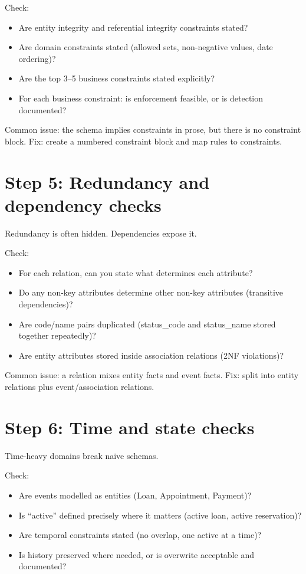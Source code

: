 Check:
\begin{itemize}[leftmargin=*,nosep]
  \item Are entity integrity and referential integrity constraints stated?
  \item Are domain constraints stated (allowed sets, non-negative values, date ordering)?
  \item Are the top 3--5 business constraints stated explicitly?
  \item For each business constraint: is enforcement feasible, or is detection documented?
\end{itemize}

Common issue: the schema implies constraints in prose, but there is no constraint block.
Fix: create a numbered constraint block and map rules to constraints.

\section{Step 5: Redundancy and dependency checks}
Redundancy is often hidden.
Dependencies expose it.

Check:
\begin{itemize}[leftmargin=*,nosep]
  \item For each relation, can you state what determines each attribute?
  \item Do any non-key attributes determine other non-key attributes (transitive dependencies)?
  \item Are code/name pairs duplicated (status\_code and status\_name stored together repeatedly)?
  \item Are entity attributes stored inside association relations (2NF violations)?
\end{itemize}

Common issue: a relation mixes entity facts and event facts.
Fix: split into entity relations plus event/association relations.

\section{Step 6: Time and state checks}
Time-heavy domains break naive schemas.

Check:
\begin{itemize}[leftmargin=*,nosep]
  \item Are events modelled as entities (Loan, Appointment, Payment)?
  \item Is “active” defined precisely where it matters (active loan, active reservation)?
  \item Are temporal constraints stated (no overlap, one active at a time)?
  \item Is history preserved where needed, or is overwrite acceptable and documented?
\end{itemize}

